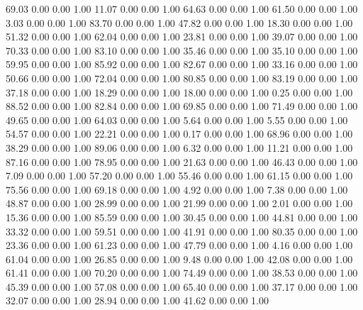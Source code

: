    69.03   0.00   0.00   1.00
   11.07   0.00   0.00   1.00
   64.63   0.00   0.00   1.00
   61.50   0.00   0.00   1.00
    3.03   0.00   0.00   1.00
   83.70   0.00   0.00   1.00
   47.82   0.00   0.00   1.00
   18.30   0.00   0.00   1.00
   51.32   0.00   0.00   1.00
   62.04   0.00   0.00   1.00
   23.81   0.00   0.00   1.00
   39.07   0.00   0.00   1.00
   70.33   0.00   0.00   1.00
   83.10   0.00   0.00   1.00
   35.46   0.00   0.00   1.00
   35.10   0.00   0.00   1.00
   59.95   0.00   0.00   1.00
   85.92   0.00   0.00   1.00
   82.67   0.00   0.00   1.00
   33.16   0.00   0.00   1.00
   50.66   0.00   0.00   1.00
   72.04   0.00   0.00   1.00
   80.85   0.00   0.00   1.00
   83.19   0.00   0.00   1.00
   37.18   0.00   0.00   1.00
   18.29   0.00   0.00   1.00
   18.00   0.00   0.00   1.00
    0.25   0.00   0.00   1.00
   88.52   0.00   0.00   1.00
   82.84   0.00   0.00   1.00
   69.85   0.00   0.00   1.00
   71.49   0.00   0.00   1.00
   49.65   0.00   0.00   1.00
   64.03   0.00   0.00   1.00
    5.64   0.00   0.00   1.00
    5.55   0.00   0.00   1.00
   54.57   0.00   0.00   1.00
   22.21   0.00   0.00   1.00
    0.17   0.00   0.00   1.00
   68.96   0.00   0.00   1.00
   38.29   0.00   0.00   1.00
   89.06   0.00   0.00   1.00
    6.32   0.00   0.00   1.00
   11.21   0.00   0.00   1.00
   87.16   0.00   0.00   1.00
   78.95   0.00   0.00   1.00
   21.63   0.00   0.00   1.00
   46.43   0.00   0.00   1.00
    7.09   0.00   0.00   1.00
   57.20   0.00   0.00   1.00
   55.46   0.00   0.00   1.00
   61.15   0.00   0.00   1.00
   75.56   0.00   0.00   1.00
   69.18   0.00   0.00   1.00
    4.92   0.00   0.00   1.00
    7.38   0.00   0.00   1.00
   48.87   0.00   0.00   1.00
   28.99   0.00   0.00   1.00
   21.99   0.00   0.00   1.00
    2.01   0.00   0.00   1.00
   15.36   0.00   0.00   1.00
   85.59   0.00   0.00   1.00
   30.45   0.00   0.00   1.00
   44.81   0.00   0.00   1.00
   33.32   0.00   0.00   1.00
   59.51   0.00   0.00   1.00
   41.91   0.00   0.00   1.00
   80.35   0.00   0.00   1.00
   23.36   0.00   0.00   1.00
   61.23   0.00   0.00   1.00
   47.79   0.00   0.00   1.00
    4.16   0.00   0.00   1.00
   61.04   0.00   0.00   1.00
   26.85   0.00   0.00   1.00
    9.48   0.00   0.00   1.00
   42.08   0.00   0.00   1.00
   61.41   0.00   0.00   1.00
   70.20   0.00   0.00   1.00
   74.49   0.00   0.00   1.00
   38.53   0.00   0.00   1.00
   45.39   0.00   0.00   1.00
   57.08   0.00   0.00   1.00
   65.40   0.00   0.00   1.00
   37.17   0.00   0.00   1.00
   32.07   0.00   0.00   1.00
   28.94   0.00   0.00   1.00
   41.62   0.00   0.00   1.00

